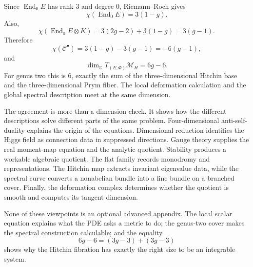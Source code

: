Since \(\operatorname{End}_0E\) has rank \(3\) and degree \(0\), Riemann--Roch gives
\[
  \chi(\operatorname{End}_0E)=3(1-g).
\]
Also,
\[
  \chi(\operatorname{End}_0E\otimes K)
  =3(2g-2)+3(1-g)=3(g-1).
\]
Therefore
\[
  \chi(\mathcal C^\bullet)
  =3(1-g)-3(g-1)
  =-6(g-1),
\]
and
\[
  \boxed{
  \dim_{\mathbb C}T_{(E,\Phi)}\mathcal M_H
  =6g-6.}
\]
For genus two this is \(6\), exactly the sum of the three-dimensional Hitchin base and the three-dimensional Prym fiber.  The local deformation calculation and the global spectral description meet at the same dimension.

The agreement is more than a dimension check.  It shows how the different descriptions solve different parts of the same problem.  Four-dimensional anti-self-duality explains the origin of the equations.  Dimensional reduction identifies the Higgs field as connection data in suppressed directions.  Gauge theory supplies the real moment-map equation and the analytic quotient.  Stability produces a workable algebraic quotient.  The flat family records monodromy and representations.  The Hitchin map extracts invariant eigenvalue data, while the spectral curve converts a nonabelian bundle into a line bundle on a branched cover.  Finally, the deformation complex determines whether the quotient is smooth and computes its tangent dimension.

None of these viewpoints is an optional advanced appendix.  The local scalar equation explains what the PDE asks a metric to do; the genus-two cover makes the spectral construction calculable; and the equality
\[
  6g-6=(3g-3)+(3g-3)
\]
shows why the Hitchin fibration has exactly the right size to be an integrable system.